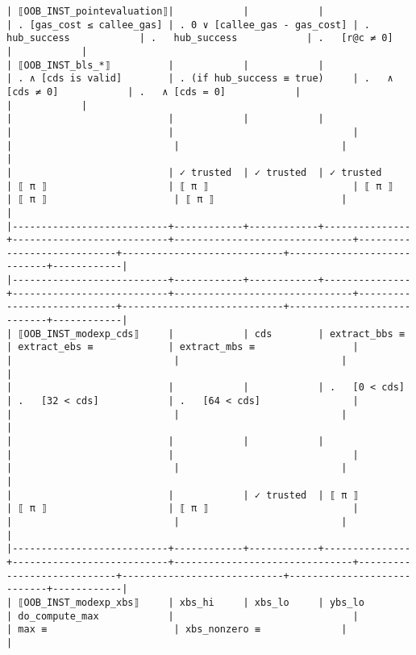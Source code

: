 \documentclass[varwidth=\maxdimen,margin=0.5cm,multi={verbatim}]{standalone}
\begin{document}
\begin{verbatim}
| ⟦OOB_INST_pointevaluation⟧|            |            |               | . [gas_cost ≤ callee_gas] | . 0 ∨ [callee_gas - gas_cost] | .   hub_success            | .   hub_success            | .   [r@c ≠ 0]              |            |
| ⟦OOB_INST_bls_*⟧          |            |            |               | . ∧ [cds is valid]        | . (if hub_success ≡ true)     | .   ∧ [cds ≠ 0]            | .   ∧ [cds = 0]            |                            |            |
|                           |            |            |               |                           |                               |                            |                            |                            |            |
|                           | ✓ trusted  | ✓ trusted  | ✓ trusted     | ⟦ π ⟧                     | ⟦ π ⟧                         | ⟦ π ⟧                      | ⟦ π ⟧                      | ⟦ π ⟧                      |            |
|---------------------------+------------+------------+---------------+---------------------------+-------------------------------+----------------------------+----------------------------+----------------------------+------------|
|---------------------------+------------+------------+---------------+---------------------------+-------------------------------+----------------------------+----------------------------+----------------------------+------------|
| ⟦OOB_INST_modexp_cds⟧     |            | cds        | extract_bbs ≡ | extract_ebs ≡             | extract_mbs ≡                 |                            |                            |                            |            |
|                           |            |            | .   [0 < cds] | .   [32 < cds]            | .   [64 < cds]                |                            |                            |                            |            |
|                           |            |            |               |                           |                               |                            |                            |                            |            |
|                           |            | ✓ trusted  | ⟦ π ⟧         | ⟦ π ⟧                     | ⟦ π ⟧                         |                            |                            |                            |            |
|---------------------------+------------+------------+---------------+---------------------------+-------------------------------+----------------------------+----------------------------+----------------------------+------------|
| ⟦OOB_INST_modexp_xbs⟧     | xbs_hi     | xbs_lo     | ybs_lo        | do_compute_max            |                               |                            | max ≡                      | xbs_nonzero ≡              |            |

\end{verbatim}
\end{document}

